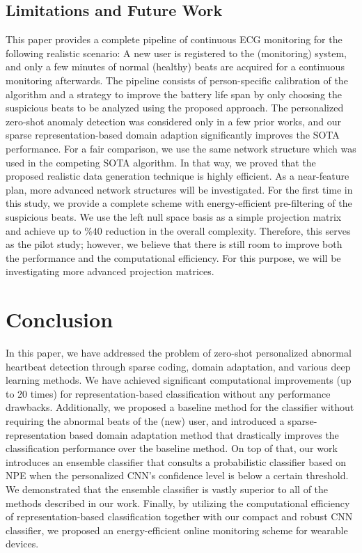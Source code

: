 \documentclass[journal,transmag]{IEEEtran}
\begin{document}
\subsection{Limitations and Future Work}
This paper provides a complete pipeline of continuous ECG monitoring for the following realistic scenario: A new user is registered to the (monitoring) system, and only a few minutes of normal (healthy) beats are acquired for a continuous monitoring afterwards. 
The pipeline consists of person-specific calibration of the algorithm and a strategy to improve the battery life span by only choosing the suspicious beats to be analyzed using the proposed approach. 
The personalized zero-shot anomaly detection was considered only in a few prior works, and our sparse representation-based domain adaption significantly improves the SOTA performance. For a fair comparison, we use the same network structure which was used in the competing SOTA algorithm. In that way, we proved that the proposed realistic data generation technique is highly efficient. As a near-feature plan, more advanced network structures will be investigated.
For the first time in this study, we provide a complete scheme with energy-efficient pre-filtering of the suspicious beats. We use the left null space basis as a simple projection matrix and achieve up to $\%40$ reduction in the overall complexity.
Therefore, this serves as the pilot study; however, we believe that there is still room to improve both the performance and the computational efficiency. For this purpose, we will be investigating more advanced projection matrices.













\section{Conclusion}
\label{sec:conclusion}
In this paper, we have addressed the problem of zero-shot personalized abnormal heartbeat detection through sparse coding, domain adaptation, and various deep learning methods. 
We have achieved significant computational improvements (up to 20 times) for representation-based classification without any performance drawbacks. Additionally, we proposed a baseline method for the classifier without requiring the abnormal beats of the (new) user, and introduced a sparse-representation based domain adaptation method that drastically improves the classification performance over the baseline method. 
On top of that, our work introduces an ensemble classifier that consults a probabilistic classifier based on NPE when the personalized CNN's confidence level is below a certain threshold. We demonstrated that the ensemble classifier is vastly superior to all of the methods described in our work. Finally, by utilizing the computational efficiency of representation-based classification together with our compact and robust CNN classifier, we proposed an energy-efficient  online monitoring scheme for wearable devices.

\ifCLASSOPTIONcaptionsoff
  \newpage
\fi




\end{document}
